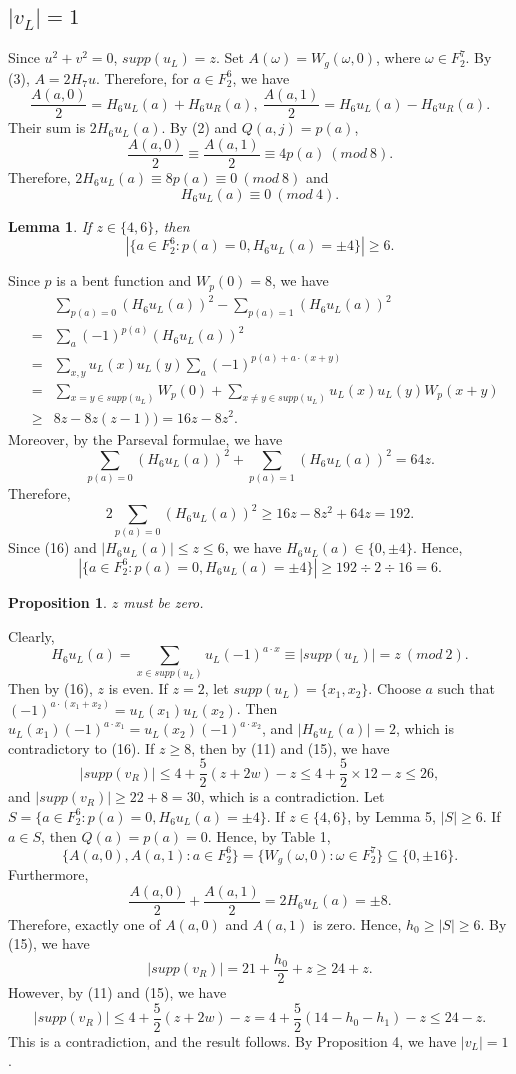 \documentclass[11pt]{article}
\newtheorem{lemma}{Lemma}
\newtheorem{proposition}{Proposition}
\newtheorem{open problem}{Open problem}
\begin{document}
 \subsection{$|v_L|=1$}
Since $u^2+v^2=0$, $supp(u_L)=z$. Set $A(\omega)=W_g(\omega,0)$, where $\omega\in F_2^7$. By (3), $A=2H_7u$. Therefore, for $a\in F_2^6$, we have
\[
\frac{A(a,0)}{2}=H_6u_L(a)+H_6u_R(a),\ \frac{A(a,1)}{2}=H_6u_L(a)-H_6u_R(a).
\]
Their sum is $2H_6u_L(a)$. By (2) and $Q(a,j)=p(a)$,
\[
\frac{A(a,0)}{2}\equiv \frac{A(a,1)}{2}\equiv4p(a) \ (mod\ 8).
\]
Therefore, $2H_6u_L(a)\equiv8p(a)\equiv0\ (mod\ 8)$ and
\begin{equation}
H_6u_L(a)\equiv0\ (mod\ 4).
\end{equation}
\begin{lemma} If $z\in\{4,6\}$, then
\[
|\{a\in F_2^6: p(a)=0, H_6u_L(a) =\pm4\}|\ge 6.
\]
\end{lemma}
\proof  Since $p$ is a bent function and $W_p(0)=8$, we have
\begin{eqnarray*}
&&\sum_{p(a)=0}(H_6u_L(a))^2-\sum_{p(a)=1}(H_6u_L(a))^2\\
&=& \sum_{a}(-1)^{p(a)}(H_6u_L(a))^2\\
&=& \sum_{x,y}u_L(x)u_L(y)\sum_a(-1)^{p(a)+a\cdot(x+y)}\\
&=& \sum_{x=y\in supp(u_L)}W_p(0)+\sum_{x\neq y\in supp(u_L)}u_L(x)u_L(y)W_p(x+y)\\
&\ge& 8z-8z(z-1))=16z-8z^2.
\end{eqnarray*}
Moreover, by the Parseval formulae, we have
\[
\sum_{p(a)=0}(H_6u_L(a))^2+\sum_{p(a)=1}(H_6u_L(a))^2=64z.
\]
Therefore,
\[
2\sum_{p(a)=0}(H_6u_L(a))^2\ge 16z-8z^2+64z=192.
\]
Since (16) and $|H_6u_L(a)|\le z\le 6$, we have $H_6u_L(a)\in \{0,\pm4\}$.
Hence,
\[
|\{a\in F_2^6: p(a)=0, H_6u_L(a) =\pm4\}|\ge 192\div2\div16=6.
\]
\endproof
\begin{proposition} $z$ must be zero.
\end{proposition}
\proof Clearly,
\[
H_6u_L(a)=\sum_{x\in supp(u_L)}u_L(-1)^{a\cdot x}\equiv |supp(u_L)|=z\ (mod\ 2).
\]
Then by (16), $z$ is even. If $z=2$, let $supp(u_L)=\{x_1,x_2\}$. Choose $a$ such that $(-1)^{a\cdot (x_1+x_2)}=u_L(x_1)u_L(x_2)$. Then $u_L(x_1)(-1)^{a\cdot x_1}=u_L(x_2)(-1)^{a\cdot x_2}$, and $|H_6u_L(a)|=2$, which is contradictory to (16).
  If $z\ge 8$, then by (11) and (15), we have
\[
|supp(v_R)|\le 4+\frac{5}{2}(z+2w)-z\le4+\frac{5}{2}\times 12-z\le 26,
\]
and $|supp(v_R)|\ge 22+8=30$,
which is a contradiction. Let $S=\{a\in F_2^6: p(a)=0, H_6u_L(a) =\pm4\}$. If $z\in\{4,6\}$, by Lemma 5, $|S|\ge 6$. If $a\in S$, then $Q(a)=p(a)=0$. Hence, by Table 1,
\[
\{A(a,0),A(a,1): a\in F_2^6\}=\{W_g(\omega,0): \omega\in F_2^7\}\subseteq\{0,\pm16\}.
\]
Furthermore,
\[
\frac{A(a,0)}{2}+\frac{A(a,1)}{2}=2H_6u_L(a)=\pm8.
\]
 Therefore, exactly one of $A(a,0)$ and $A(a,1)$ is zero. Hence, $h_0\ge |S|\ge6$.
By (15), we have
\[
|supp(v_R)|=21+\frac{h_0}{2}+z\ge 24+z.
\]
However, by (11) and (15), we have
\[
|supp(v_R)|\le 4+\frac{5}{2}(z+2w)-z=4+\frac{5}{2}(14-h_0-h_1)-z\le 24-z.
\]
This is a contradiction, and the result follows.
\endproof
By Proposition 4, we have $|v_L|=1$.
\end{document}
